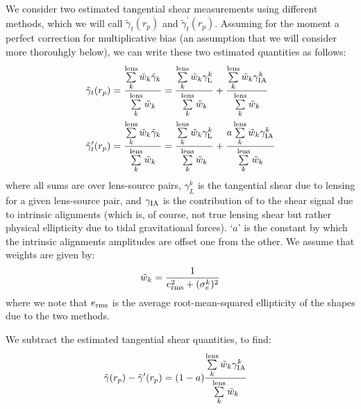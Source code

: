 \documentclass[a4paper,fleqn,usenatbib]{mnras}
\begin{document}
We consider two estimated tangential shear measurements using different methods, which we will call $\tilde{\gamma}_t(r_p)$ and $\tilde{\gamma}_t^\prime(r_p)$. Assuming for the moment a perfect correction for multiplicative bias (an assumption that we will consider more thorouhgly below), we can write these two estimated quantities as follows:
\begin{align}
\tilde{\gamma}_t(r_p) &= \frac{\sum\limits_{k}^{\rm lens} \tilde{w}_k \tilde{\gamma}_k}{\sum\limits_{k}^{\rm lens} \tilde{w}_k} = \frac{\sum\limits_{k}^{\rm lens} \tilde{w}_k \gamma_{\rm L}^k}{\sum\limits_{k}^{\rm lens} \tilde{w}_k}+\frac{\sum\limits_{k}^{\rm lens} \tilde{w}_k \gamma_{\rm IA}^k}{\sum\limits_{k}^{\rm lens} \tilde{w}_k} \nonumber \\ 
\tilde{\gamma}_t^\prime (r_p) &= \frac{\sum\limits_{k}^{\rm lens} \tilde{w}_k \tilde{\gamma}_k}{\sum\limits_{k}^{\rm lens} \tilde{w}_k} = \frac{\sum\limits_{k}^{\rm lens} \tilde{w}_k \gamma_{\rm L}^k}{\sum\limits_{k}^{\rm lens} \tilde{w}_k}+\frac{a \sum\limits_{k}^{\rm lens} \tilde{w}_k \gamma_{\rm IA}^k}{\sum\limits_{k}^{\rm lens} \tilde{w}_k} 
\label{full_both}
\end{align}
where all sums are over lens-source pairs, $\gamma_L^k$ is the tangential shear due to lensing for a given lens-source pair, and $\gamma_{\rm IA}$ is the contribution of to the shear signal due to intrinsic alignments (which is, of course, not true lensing shear but rather physical ellipticity due to tidal gravitational forces). `$a$' is the constant by which the intrinsic alignments amplitudes are offset one from the other. We assume that weights are given by:
\begin{equation}
\tilde{w}_k = \frac{1}{e_{\rm rms}^2 + (\sigma_e^k)^2}
\label{weights}
\end{equation}
where we note that $e_{\rm rms}$ is the average root-mean-squared ellipticity of the shapes due to the two methods.

We subtract the estimated tangential shear quantities, to find:
\begin{align}
\tilde{\gamma}(r_p) - \tilde{\gamma}^\prime(r_p) &= (1-a) \frac{\sum\limits_{k}^{\rm lens} \tilde{w}_k \gamma_{\rm IA}^k}{\sum\limits_{k}^{\rm lens} \tilde{w}_k} 
\label{subtract_gammat}
\end{align}
\end{document}
